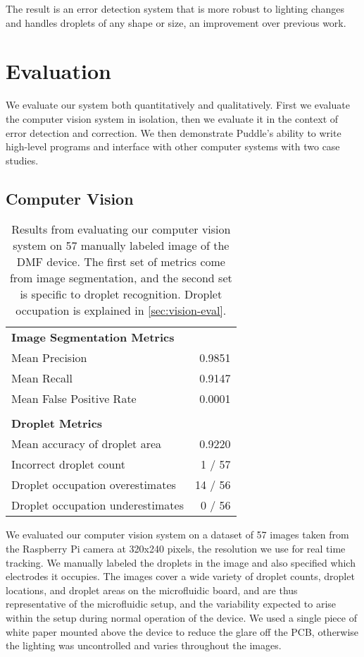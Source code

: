 \documentclass[sigconf, screen]{acmart}
\begin{document}
The result is an error detection system that is more robust to lighting changes and handles droplets of any shape or size, an improvement over previous work.


\section{Evaluation}
\label{sec:eval}

We evaluate our system both quantitatively and qualitatively.
First we evaluate the computer vision system in isolation, then we evaluate it in the context of error detection and correction.
We then demonstrate Puddle's ability to write high-level programs and interface with other computer systems with two case studies.

\subsection{Computer Vision}
\label{sec:vision-eval}

\begin{table}
  \centering
  \begin{tabular}{lr}
    \bf Image Segmentation Metrics \\
    Mean Precision & 0.9851 \\
    Mean Recall & 0.9147 \\
    Mean False Positive Rate & 0.0001 \\
    \\
    \bf Droplet Metrics \\
    Mean accuracy of droplet area & 0.9220  \\
    Incorrect droplet count & 1 / 57 \\
    Droplet occupation overestimates & 14 / 56 \\
    Droplet occupation underestimates & 0 / 56 \\
  \end{tabular}
  \caption{
    Results from evaluating our computer vision system on 57 manually labeled image of the DMF device.
    The first set of metrics come from image segmentation, and the second set is specific to droplet recognition.
    Droplet occupation is explained in \autoref{sec:vision-eval}.
  }
  \label{tab:vision-results}
\end{table}

We evaluated our computer vision system on a dataset of 57 images taken from the Raspberry Pi camera at 320x240 pixels, the resolution we use for real time tracking.
We manually labeled the droplets in the image and also specified which electrodes it occupies.
The images cover a wide variety of droplet counts, droplet locations, and droplet areas on the microfluidic board, and are thus representative of the microfluidic setup, and the variability expected to arise within the setup during normal operation of the device.
We used a single piece of white paper mounted above the device to reduce the glare off the PCB, otherwise the lighting was uncontrolled and varies throughout the images.
\end{document}
